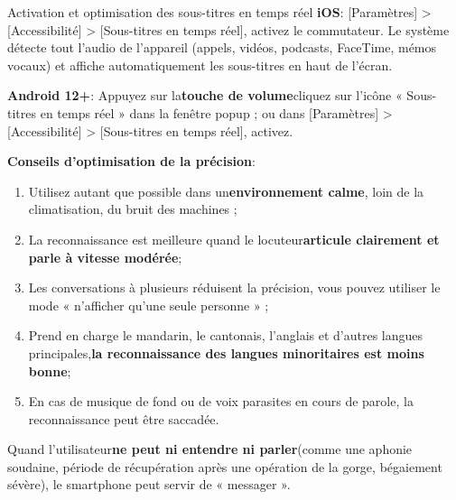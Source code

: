 \begin{tcbinfo}{Activation et optimisation des sous-titres en temps réel}
\textbf{iOS}: [Paramètres] > [Accessibilité] > [Sous-titres en temps réel], activez le commutateur. Le système détecte tout l'audio de l'appareil (appels, vidéos, podcasts, FaceTime, mémos vocaux) et affiche automatiquement les sous-titres en haut de l'écran.

\textbf{Android 12+}: Appuyez sur la\textbf{touche de volume}cliquez sur l'icône « Sous-titres en temps réel » dans la fenêtre popup ; ou dans [Paramètres] > [Accessibilité] > [Sous-titres en temps réel], activez.

\textbf{Conseils d'optimisation de la précision}:

\begin{enumerate}
  \item Utilisez autant que possible dans un\textbf{environnement calme}, loin de la climatisation, du bruit des machines ;
  \item La reconnaissance est meilleure quand le locuteur\textbf{articule clairement et parle à vitesse modérée};
  \item Les conversations à plusieurs réduisent la précision, vous pouvez utiliser le mode « n'afficher qu'une seule personne » ;
  \item Prend en charge le mandarin, le cantonais, l'anglais et d'autres langues principales,\textbf{la reconnaissance des langues minoritaires est moins bonne};
  \item En cas de musique de fond ou de voix parasites en cours de parole, la reconnaissance peut être saccadée.
\end{enumerate}

\end{tcbinfo}


Quand l'utilisateur\textbf{ne peut ni entendre ni parler}(comme une aphonie soudaine, période de récupération après une opération de la gorge, bégaiement sévère), le smartphone peut servir de « messager ».

